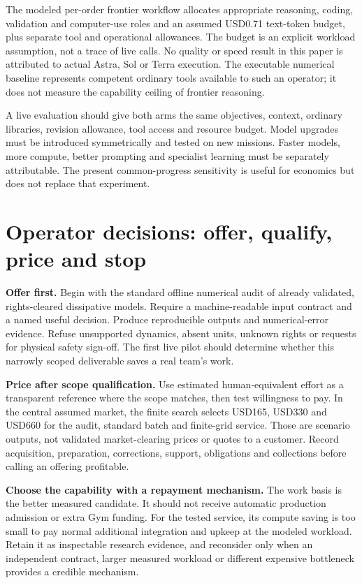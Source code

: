 \documentclass[11pt,letterpaper]{article}
\begin{document}
The modeled per-order frontier workflow allocates appropriate reasoning, coding, validation and computer-use roles and an assumed USD0.71 text-token budget, plus separate tool and operational allowances. The budget is an explicit workload assumption, not a trace of live calls. No quality or speed result in this paper is attributed to actual Astra, Sol or Terra execution. The executable numerical baseline represents competent ordinary tools available to such an operator; it does not measure the capability ceiling of frontier reasoning.

A live evaluation should give both arms the same objectives, context, ordinary libraries, revision allowance, tool access and resource budget. Model upgrades must be introduced symmetrically and tested on new missions. Faster models, more compute, better prompting and specialist learning must be separately attributable. The present common-progress sensitivity is useful for economics but does not replace that experiment.

\section{Operator decisions: offer, qualify, price and stop}

\textbf{Offer first.} Begin with the standard offline numerical audit of already validated, rights-cleared dissipative models. Require a machine-readable input contract and a named useful decision. Produce reproducible outputs and numerical-error evidence. Refuse unsupported dynamics, absent units, unknown rights or requests for physical safety sign-off. The first live pilot should determine whether this narrowly scoped deliverable saves a real team's work.

\textbf{Price after scope qualification.} Use estimated human-equivalent effort as a transparent reference where the scope matches, then test willingness to pay. In the central assumed market, the finite search selects USD165, USD330 and USD660 for the audit, standard batch and finite-grid service. Those are scenario outputs, not validated market-clearing prices or quotes to a customer. Record acquisition, preparation, corrections, support, obligations and collections before calling an offering profitable.

\textbf{Choose the capability with a repayment mechanism.} The work basis is the better measured candidate. It should not receive automatic production admission or extra Gym funding. For the tested service, its compute saving is too small to pay normal additional integration and upkeep at the modeled workload. Retain it as inspectable research evidence, and reconsider only when an independent contract, larger measured workload or different expensive bottleneck provides a credible mechanism.
\end{document}
